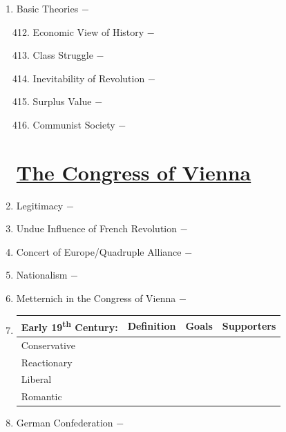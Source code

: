\documentclass[12pt]{article}
\begin{document}
\begin{enumerate}
\item Basic Theories $-$

\begin{enumerate}[label=\arabic{*}.]
\setcounter{enumii}{411}

\item Economic View of History $-$

\item Class Struggle $-$

\item Inevitability of Revolution $-$ 

\item Surplus Value $-$

\item Communist Society $-$ 

\end{enumerate}
\setcounter{enumi}{416}

\section{\underline{The Congress of Vienna}}

\item Legitimacy $-$ 

\item Undue Influence of French Revolution $-$ 

\item Concert of Europe/Quadruple Alliance $-$

\item Nationalism $-$

\item Metternich in the Congress of Vienna $-$

\item \begin{tabular}{l c c c}

\hline  
Early 19\textsuperscript{th} Century: & Definition & Goals & Supporters \\
\hline
Conservative & & & \\
\hline
Reactionary & & & \\
\hline
Liberal & & & \\
\hline
Romantic & & & \\
\hline

\end{tabular}

\item German Confederation $-$

\begin{enumerate}[label=\arabic{*}.]
\setcounter{enumii}{423}


\end{enumerate}
\end{enumerate}
\end{document}
